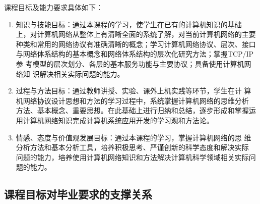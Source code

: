 \documentclass{swfusyllabus}
\begin{document}
课程目标及能力要求具体如下：
\begin{enumerate}

\item 知识与技能目标：通过本课程的学习，使学生在已有的计算机知识的基础
  上，对计算机网络从整体上有清晰全面的系统了解，对当前计算机网络的主要
  种类和常用的网络协议有准确清晰的概念；学习计算机网络协议、层次、接口
  与网络体系结构的基本概念和网络体系结构的层次化研究方法；掌握TCP/IP参
  考模型的层次划分、各层的基本服务功能与主要协议；具备使用计算机网络知
  识解决相关实际问题的能力。
\item 过程与方法目标：通过教师讲授、实验、课外上机实践等环节，学生在计
  算机网络协议设计思想和方法的学习过程中，系统掌握计算机网络的思维分析
  方法、基本概念、重要思想。在此基础上进行归纳和总结，逐步形成和掌握运
  用计算机网络知识完成计算机系统应用开发的学习观和方法论。
\item 情感、态度与价值观发展目标：通过本课程的学习，掌握计算机网络的思
  维分析方法和基本分析工具，培养积极思考、严谨创新的科学态度和解决实际
  问题的能力，培养使用计算机网络知识和方法解决计算机科学领域相关实际问
  题的能力。
\end{enumerate}

\subsection{课程目标对毕业要求的支撑关系}
\end{document}
